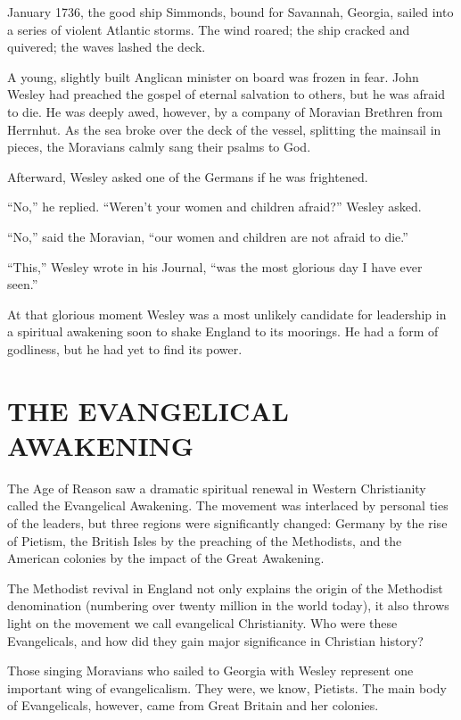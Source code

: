 
 January 1736, the good ship Simmonds, bound for Savannah, Georgia,
sailed into a series of violent Atlantic storms. The wind roared; the ship cracked and quivered; the
waves lashed the deck.

A young, slightly built Anglican minister on board was frozen in fear. John Wesley had preached the
gospel of eternal salvation to others, but he was afraid to die. He was deeply awed, however, by a
company of Moravian Brethren from Herrnhut. As the sea broke over the deck of the vessel, splitting
the mainsail in pieces, the Moravians calmly sang their psalms to God.

Afterward, Wesley asked one of the Germans if he was frightened.

“No,” he replied. “Weren’t your women and children afraid?” Wesley asked.

“No,” said the Moravian, “our women and children are not afraid to die.”

“This,” Wesley wrote in his Journal, “was the most glorious day I have ever seen.”

At that glorious moment Wesley was a most unlikely candidate for leadership in a spiritual awakening
soon to shake England to its moorings. He had a form of godliness, but he had yet to find its power.

\section{THE EVANGELICAL AWAKENING}

The Age of Reason saw a dramatic spiritual renewal in Western Christianity called the Evangelical
Awakening. The movement was interlaced by personal ties of the leaders, but three regions were
significantly changed: Germany by the rise of Pietism, the British Isles by the preaching of the
Methodists, and the American colonies by the impact of the Great Awakening.

The Methodist revival in England not only explains the origin of the Methodist denomination
(numbering over twenty million in the world today), it also throws light on the movement we call
evangelical Christianity. Who were these Evangelicals, and how did they gain major significance in
Christian history?

Those singing Moravians who sailed to Georgia with Wesley represent one important wing of
evangelicalism. They were, we know, Pietists. The main body of Evangelicals, however, came from
Great Britain and her colonies.

